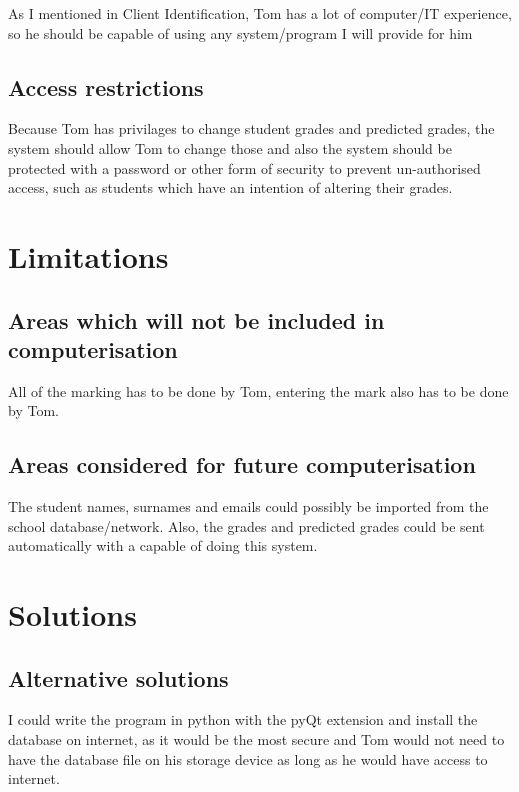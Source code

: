 \begin{algorithm}[H]
As I mentioned in Client Identification, Tom has a lot of computer/IT experience, so he should be capable of using any system/program I will provide for him

\subsection{Access restrictions}
Because Tom has privilages to change student grades and predicted grades, the system should allow Tom to change those and also the system should be protected with a password or other form of security to prevent un-authorised access, such as students which have an intention of altering their grades.

\section{Limitations}

\subsection{Areas which will not be included in computerisation}
All of the marking has to be done by Tom, entering the mark also has to be done by Tom.

\subsection{Areas considered for future computerisation}
The student names, surnames and emails could possibly be imported from the school database/network. Also, the grades and predicted grades could be sent automatically with a capable of doing this system.

\section{Solutions}

\subsection{Alternative solutions}

I could write the program in python with the pyQt extension and install the database on internet, as it would be the most secure and Tom would not need to have the database file on his storage device as long as he would have access to internet.


\end{algorithm}
